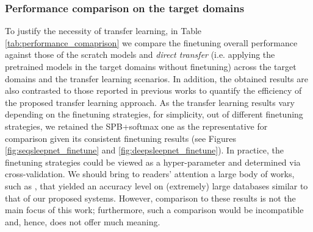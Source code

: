 \documentclass[journal,twoside,web]{ieeecolor}
\begin{document}
\subsubsection{Performance comparison on the target domains}

To justify the necessity of transfer learning, in Table \ref{tab:performance_comaprison} we compare the finetuning overall performance against those of the scratch models and \emph{direct transfer} (i.e. applying the pretrained models in the target domains without finetuning) across the target domains and the transfer learning scenarios. In addition, the obtained results are also contrasted to those reported in previous works to quantify the efficiency of the proposed transfer learning approach. As the transfer learning results vary depending on the finetuning strategies, for simplicity, out of different finetuning strategies, we retained the SPB+softmax one as the representative for comparison given its consistent finetuning results (see Figures  \ref{fig:seqsleepnet_finetune} and \ref{fig:deepsleepnet_finetune}).  In practice, the finetuning strategies could be viewed as a hyper-parameter and determined via cross-validation. We should bring to readers' attention a large body of works, such as \cite{Biswal2018a,Stephansen2018,Sun2017,Olesen2018}, that yielded an accuracy level on (extremely) large databases similar to that of our proposed systems. However, comparison to these results is not the main focus of this work; furthermore, such a comparison would be incompatible and, hence, does not offer much meaning.
\end{document}
